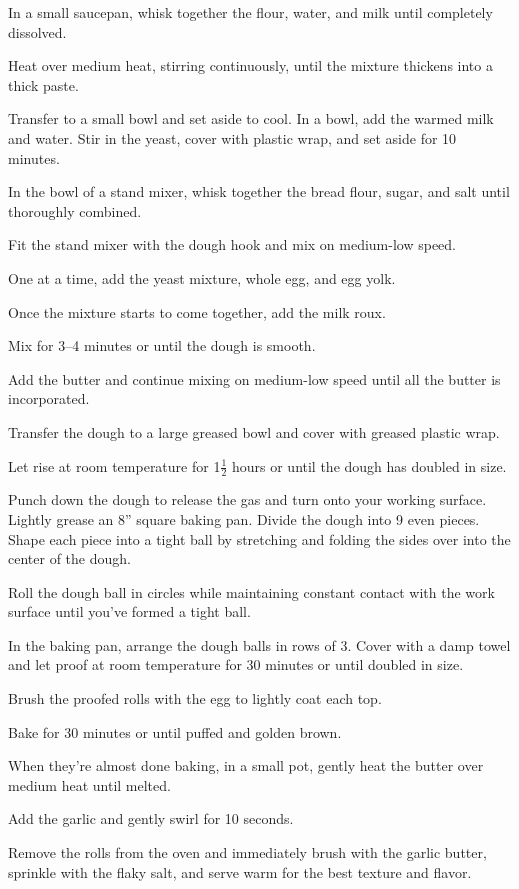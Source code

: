 \begin{method}
        In a small saucepan, whisk together the flour, water, and milk until completely dissolved.\par
        Heat over medium heat, stirring continuously, until the mixture thickens into a thick paste.\par
        Transfer to a small bowl and set aside to cool.
        In a bowl, add the warmed milk and water. Stir in the yeast, cover with plastic wrap, and set aside for 10 minutes.\par
        In the bowl of a stand mixer, whisk together the bread flour, sugar, and salt until thoroughly combined.\par
        Fit the stand mixer with the dough hook and mix on medium-low speed.\par
        One at a time, add the yeast mixture, whole egg, and egg yolk.\par
        Once the mixture starts to come together, add the milk roux.\par
        Mix for 3--4 minutes or until the dough is smooth.\par
        Add the butter and continue mixing on medium-low speed until all the butter is incorporated.\par
        Transfer the dough to a large greased bowl and cover with greased plastic wrap.\par
        Let rise at room temperature for 1$\frac{1}{2}$ hours or until the dough has doubled in size.\par
        Punch down the dough to release the gas and turn onto your working surface.
        Lightly grease an 8'' square baking pan. Divide the dough into 9 even pieces. Shape each piece into a tight ball by stretching and folding the sides over into the center of the dough.\par
        Roll the dough ball in circles while maintaining constant contact with the work surface until you've formed a tight ball.\par
        In the baking pan, arrange the dough balls in rows of 3. Cover with a damp towel and let proof at room temperature for 30 minutes or until doubled in size.\par
        Brush the proofed rolls with the egg to lightly coat each top.\par
        Bake for 30 minutes or until puffed and golden brown.\par
        When they're almost done baking, in a small pot, gently heat the butter over medium heat until melted.\par
        Add the garlic and gently swirl for 10 seconds.\par
        Remove the rolls from the oven and immediately brush with the garlic butter, sprinkle with the flaky salt, and serve warm for the best texture and flavor.
\end{method}
